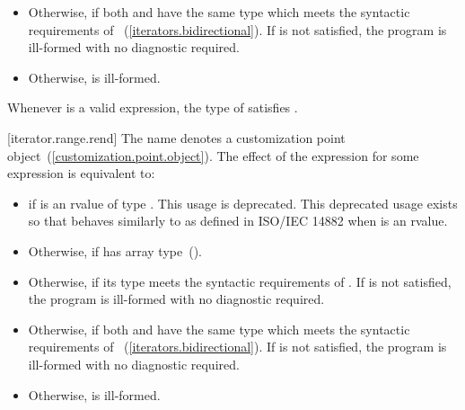 {\begin{itemize}
\item
  Otherwise,  if both
   and  have the same
  type  which meets the syntactic requirements of
  ~(\ref{iterators.bidirectional}).
  If  is not satisfied, the program
  is ill-formed with no diagnostic required.

\item
  Otherwise,  is ill-formed.
\end{itemize}

\pnum
\remark Whenever  is a valid expression, the
type of  satisfies .

[iterator.range.rend]{}
\pnum
The name  denotes a customization point
object~(\ref{customization.point.object}). The effect of the expression
 for some expression  is equivalent to:

\begin{itemize}
\item
   if  is an rvalue of
  type . This usage is deprecated.
  \enternote This deprecated usage exists so that
   behaves similarly to 
  as defined in ISO/IEC 14882 when  is an rvalue. \exitnote

\item
  Otherwise,  if  has
  array type~().

\item
  Otherwise,  if its type  meets the
  syntactic requirements of
  . If
   is not satisfied, the program is ill-formed with
  no diagnostic required.

\item
  Otherwise,  if both
   and  have the same
  type  which meets the syntactic requirements of
  ~(\ref{iterators.bidirectional}).
  If  is not satisfied, the program is
  ill-formed with no diagnostic required.

\item
  Otherwise,  is ill-formed.
\end{itemize}

}
